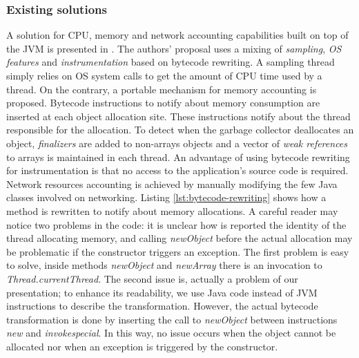 \subsubsection*{Existing solutions}
A solution for CPU, memory and network accounting capabilities built on top of the JVM is presented in \cite{czajkowski_jres:_1998}.
The authors' proposal uses a mixing of \textit{sampling}, \textit{OS features} and \textit{instrumentation} based on bytecode rewriting.
A sampling thread simply relies on OS system calls to get the amount of CPU time used by a thread.
On the contrary, a portable mechanism for memory accounting is proposed.
Bytecode instructions to notify about memory consumption are inserted at each object allocation site.
These instructions notify about the thread responsible for the allocation.
To detect when the garbage collector deallocates an object, \textit{finalizers} are added to non-arrays objects and a vector of \textit{weak references} to arrays is maintained in each thread.
An advantage of using bytecode rewriting for instrumentation is that no access to the application's source code is required.
Network resources accounting is achieved by manually modifying the few Java classes involved on networking.
Listing \ref{lst:bytecode-rewriting} shows how a method is rewritten to notify about memory allocations. 
A careful reader may notice two problems in the code: it is unclear how is reported the identity of the thread allocating memory, and calling \textit{newObject} before the actual allocation may be problematic if the constructor triggers an exception.
The first problem is easy to solve, inside methods \textit{newObject} and \textit{newArray} there is an invocation to \textit{Thread.currentThread}.
The second issue is, actually a problem of our presentation; to enhance its readability, we use Java code instead of JVM instructions to describe the transformation.
However, the actual bytecode transformation is done by inserting the call to \textit{newObject} between instructions \textit{new} and \textit{invokespecial}.
In this way, no issue occurs when the object cannot be allocated nor when an exception is triggered by the constructor.

\begin{lstlisting}
\end{lstlisting}


